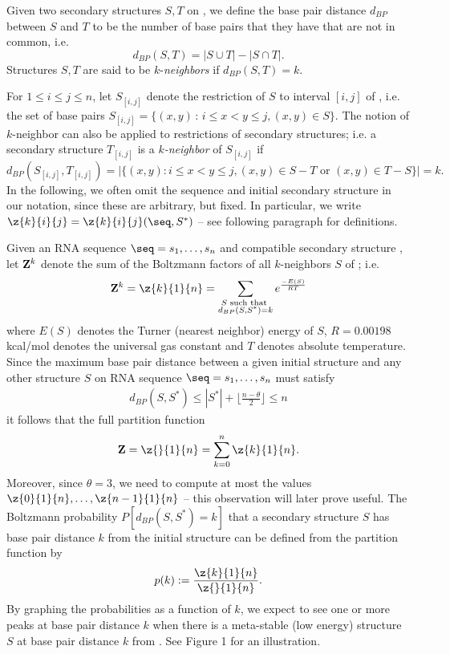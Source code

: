 Given two secondary structures $S,T$ on \seq, we
define the base pair distance $d_{BP}$ between $S$ and $T$
to be the number of base pairs that they have that are not in
common, i.e.
\begin{equation}
d_{BP}(S,T) = |S \cup T| - |S \cap T|.
\end{equation}
Structures $S,T$ are said to be $k$-{\em neighbors} if $d_{BP}(S,T) = k$.


For $1\leq i \leq j \leq n$, let
$S_{[i,j]}$ denote the restriction of $S$ to interval
$[i,j]$ of \seq, i.e. the set of base pairs
%
$S_{[i,j]} = \{ (x,y) \,:\, i \leq  x < y \leq j,  (x,y) \in S \}$.
%
The notion of $k$-neighbor can also be applied to restrictions of secondary
structures; i.e. a secondary structure $T_{[i,j]}$ is a
{\em $k$-neighbor} of $S_{[i,j]}$ if
\[
d_{BP}(S_{[i,j]},T_{[i,j]})= |\{ (x,y): i \leq x<y\leq j,
(x,y) \in S-T \mbox{ or } (x,y) \in T-S \}| = k.
\]
In the following,
we often omit the sequence \seq and initial secondary structure \strSt in our
notation, since these are arbitrary, but fixed.
In particular, we write $\z{k}{i}{j} = \z{k}{i}{j}(\seq,S^*)$ --
see following paragraph for definitions.


Given an RNA sequence $\seq=s_1,\ldots,s_n$ and compatible secondary structure
\strSt, let ${\bf Z}^k$ denote the sum
of the Boltzmann factors \boltzf{\str} of all $k$-neighbors $S$ of  \strSt;
i.e.
\[
{\bf Z}^k = \z{k}{1}{n} =
\sum_{\substack{S \text{ such that }\\ d_{BP}(S,S^*)=k}}
e^{\frac{-E(S)}{RT}}
\]
where $E(S)$ denotes the Turner (nearest neighbor)
energy \citep{turner,xia:RNA}
of $S$, $R = 0.00198$ kcal/mol denotes the universal
gas constant and $T$ denotes absolute temperature.
Since the maximum base pair distance between a given initial
structure \strSt and any other structure $S$ on RNA sequence
$\seq = s_1,\ldots,s_n$ must satisfy
\begin{eqnarray}
\label{eq:upperBound}
d_{BP}(S,S^*) \leq |S^*| + \lfloor \frac{n-\theta}{2} \rfloor \leq n
\end{eqnarray}
it follows that the full partition function
\begin{eqnarray}
\label{eq:mcCaskillPartitionFun}
{\bf Z}=\z{}{1}{n} = \sum_{k=0}^n \z{k}{1}{n}.
\end{eqnarray}
Moreover, since $\theta=3$,
we need to compute at most the values
$\z{0}{1}{n},\ldots,\z{n-1}{1}{n}$ -- this observation will later prove useful.
The Boltzmann probability
$P[d_{BP}(S,S^*) = k]$
that a secondary structure $S$ has base pair distance $k$ from the initial
structure \strSt can be defined from the partition function by
\[
p(k) :=\frac{\z{k}{1}{n}}{\z{}{1}{n}}.
\]
By graphing the probabilities \pk as a function of $k$,
we expect to see one or more peaks at base pair distance $k$ when
there is a meta-stable (low energy) structure $S$
at base pair distance $k$ from \strSt.
See Figure 1 for an illustration.

